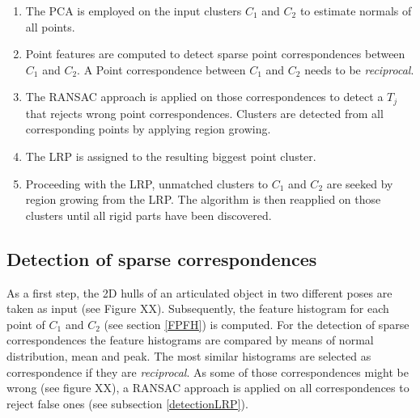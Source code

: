 \begin{enumerate}
	\item The PCA is employed on the input clusters $C_1$ and $C_2$ to estimate normals of all points.
	\item Point features are computed to detect sparse point correspondences between $C_1$ and $C_2$. A Point correspondence between $C_1$ and $C_2$ needs to be \textit{reciprocal}.
	\item The RANSAC approach is applied on those correspondences to detect a $T_j$ that rejects wrong point correspondences. Clusters are detected from all corresponding points by applying region growing.
	\item The LRP is assigned to the resulting biggest point cluster.
	\item Proceeding with the LRP, unmatched clusters to $C_1$ and $C_2$ are seeked by region growing from the LRP. The algorithm is then reapplied on those clusters until all rigid parts have been discovered.
\end{enumerate}

\subsection{Detection of sparse correspondences}
\label{correspondences}

As a first step, the 2D hulls of an articulated object in two different poses are taken as input (see Figure XX). Subsequently, the feature histogram for each point of $C_1$ and $C_2$ (see section \ref{FPFH}) is computed. For the detection of sparse correspondences the feature histograms are compared by means of normal distribution, mean and peak. The most similar histograms are selected as correspondence if they are \textit{reciprocal}.
As some of those correspondences might be wrong (see figure XX), a RANSAC approach is applied on all correspondences to reject false ones (see subsection \ref{detectionLRP}).




